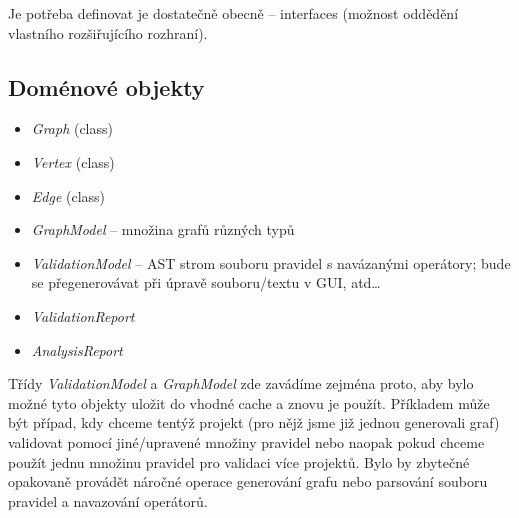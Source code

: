 Je potřeba definovat je dostatečně obecně -- interfaces (možnost oddědění vlastního rozšiřujícího rozhraní).

\subsection{Doménové objekty}


\begin{itemize}
\item \emph{Graph} (class)
\item \emph{Vertex} (class)
\item \emph{Edge} (class)
\item \emph{GraphModel} -- množina grafů různých typů
\item \emph{ValidationModel} -- AST strom souboru pravidel s navázanými operátory; bude se přegenerovávat při úpravě souboru/textu v GUI, atd\ldots
\item \emph{ValidationReport}
\item \emph{AnalysisReport}
\end{itemize}

Třídy \emph{ValidationModel} a \emph{GraphModel} zde zavádíme zejména proto, aby bylo možné tyto objekty uložit do vhodné cache a znovu je použít. Příkladem může být případ, kdy chceme tentýž projekt (pro nějž jsme již jednou generovali graf) validovat pomocí jiné/upravené množiny pravidel nebo naopak pokud chceme použít jednu množinu pravidel pro validaci více projektů. Bylo by zbytečné opakovaně provádět náročné operace generování grafu nebo parsování souboru pravidel a navazování operátorů.

